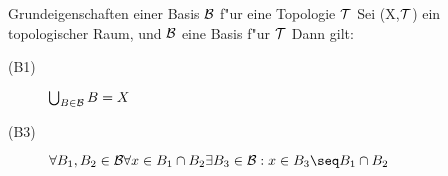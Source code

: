 \begin{satz}\label{2.18}{\sc Grundeigenschaften einer Basis $\mathcal B$ f"ur eine Topologie $\mathcal T$}
Sei (X,$\mathcal T$) ein topologischer Raum, und $\mathcal B$ eine Basis f"ur $\mathcal T$ Dann gilt:
\begin{description}
\item[(B1)] $\bigcup_{B\in\mathcal B}B=X$
\item[(B3)] $\forall B_1,B_2\in\B \forall x\in B_1\cap B_2\exists B_3\in\B :x\in B_3\seq B_1\cap B_2$
\end{description}
\end{satz}
